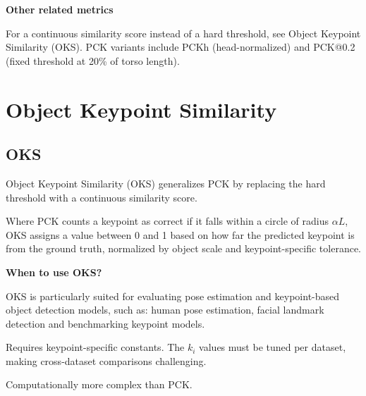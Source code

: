 \textbf{Other related metrics}

For a continuous similarity score instead of a hard threshold, see Object Keypoint Similarity (OKS).
PCK variants include PCKh (head-normalized) and PCK@0.2 (fixed threshold at 20\% of torso length).

\clearpage
\thispagestyle{cvstyle}
\section{Object Keypoint Similarity}
\subsection{OKS}

Object Keypoint Similarity (OKS) generalizes PCK by replacing the hard threshold with a continuous similarity score.  

Where PCK counts a keypoint as correct if it falls within a circle of radius $\alpha L$, OKS assigns a value between 0 and 1 based on how far the predicted keypoint is from the ground truth, normalized by object scale and keypoint-specific tolerance.

\noindent
{}

\textbf{When to use OKS?}

OKS is particularly suited for evaluating pose estimation and keypoint-based object detection models, such as: human pose
estimation, facial landmark detection and benchmarking keypoint models.


{
\item Requires keypoint-specific constants. The $k_i$ values must be tuned per dataset, making cross-dataset comparisons
challenging.
\item Computationally more complex than PCK.
}

